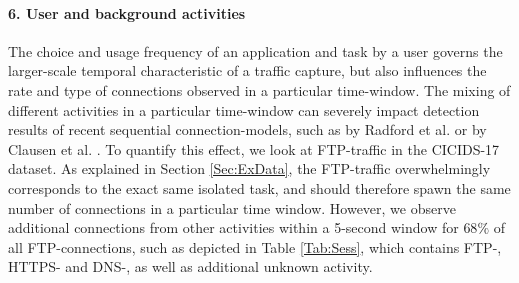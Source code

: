\documentclass[runningheads]{llncs}
\begin{document}







\paragraph{6. User and background activities}
The choice and usage frequency of an application and task by a user governs the larger-scale temporal characteristic of a traffic capture, but also influences the rate and type of connections observed in a particular time-window. The mixing of different activities in a particular time-window can severely impact detection results of recent sequential connection-models, such as by Radford et al. \cite{radford2018network} or by Clausen et al. \cite{henryLSTM}. To quantify this effect, we look at FTP-traffic in the CICIDS-17 dataset. As explained in Section \ref{Sec:ExData}, the FTP-traffic overwhelmingly corresponds to the exact same isolated task, and should therefore spawn the same number of connections in a particular time window. However, we observe additional connections from other activities within a 5-second window for $68\%$ of all FTP-connections, such as depicted in Table \ref{Tab:Sess}, which contains FTP-, HTTPS- and DNS-, as well as additional unknown activity.
\end{document}
